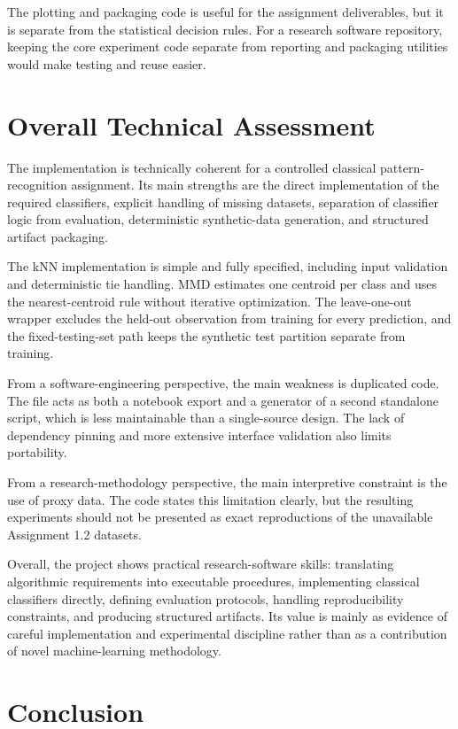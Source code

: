 \documentclass[11pt,a4paper]{article}
\begin{document}
The plotting and packaging code is useful for the assignment deliverables, but it is separate from the statistical decision rules. For a research software repository, keeping the core experiment code separate from reporting and packaging utilities would make testing and reuse easier.

\section{Overall Technical Assessment}

The implementation is technically coherent for a controlled classical pattern-recognition assignment. Its main strengths are the direct implementation of the required classifiers, explicit handling of missing datasets, separation of classifier logic from evaluation, deterministic synthetic-data generation, and structured artifact packaging.

The kNN implementation is simple and fully specified, including input validation and deterministic tie handling. MMD estimates one centroid per class and uses the nearest-centroid rule without iterative optimization. The leave-one-out wrapper excludes the held-out observation from training for every prediction, and the fixed-testing-set path keeps the synthetic test partition separate from training.

From a software-engineering perspective, the main weakness is duplicated code. The file acts as both a notebook export and a generator of a second standalone script, which is less maintainable than a single-source design. The lack of dependency pinning and more extensive interface validation also limits portability.

From a research-methodology perspective, the main interpretive constraint is the use of proxy data. The code states this limitation clearly, but the resulting experiments should not be presented as exact reproductions of the unavailable Assignment 1.2 datasets.

Overall, the project shows practical research-software skills: translating algorithmic requirements into executable procedures, implementing classical classifiers directly, defining evaluation protocols, handling reproducibility constraints, and producing structured artifacts. Its value is mainly as evidence of careful implementation and experimental discipline rather than as a contribution of novel machine-learning methodology.

\section{Conclusion}
\end{document}
